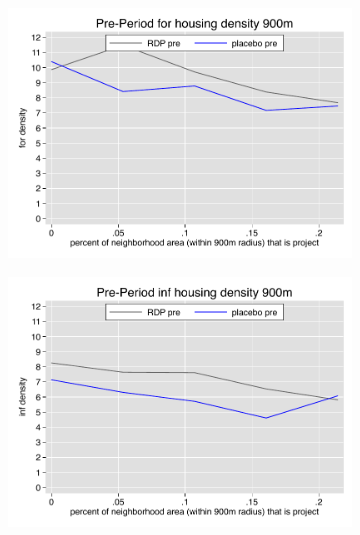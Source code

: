 \documentclass[12pt]{article}
\begin{document}
\begin{figure}
        \begin{subfigure}[b]{0.495\textwidth}
            \centering
            \includegraphics[width=\textwidth,trim={0.3cm .3cm 0.1cm 0cm}, clip=true]{figures/overlap_for_900_total_pre.pdf}
        \end{subfigure}
        \hfill
        \begin{subfigure}[b]{0.495\textwidth}  
            \centering 
            \includegraphics[width=\textwidth,trim={0.3cm .3cm 0.1cm 0cm}, clip=true]{figures/overlap_inf_900_total_pre.pdf}
        \end{subfigure}
        \vspace{-6mm}

\end{figure}
\end{document}
